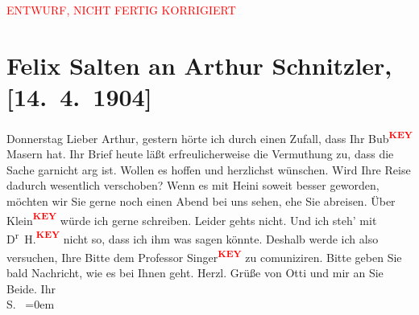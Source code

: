 
\begin{center}
            \textcolor{red}{ENTWURF, NICHT FERTIG KORRIGIERT}
                      \end{center}
            
         
         \renewcommand{\erwaehntePersonen}{Personen: Ottilie Salten, Heinrich Schnitzler, Olga Schnitzler}
         \renewcommand{\erwaehnteOrte}{Orte: Wien}
         \renewcommand{\erwaehnteWerke}{}
               \section[Felix Salten an Arthur Schnitzler, {[}14. 4. 1904{]}]{ Felix Salten an Arthur Schnitzler, {[}14. 4. 1904{]}}\nopagebreak{}\rehead{ }\begin{ledgroupsized}[t]{13cm}\normalsize\beginnumbering \toendnotes[C]{\smallbreak\pagebreak[2]} 
\toendnotes[C]{\smallbreak}\pstart
           \raggedleft{}{\pb}Donnerstag\pend
           \pstart
           Lieber Arthur, gestern hörte ich durch einen Zufall, dass Ihr Bub\textcolor{red}{\textsuperscript{\textbf{KEY}}} Masern hat. Ihr Brief heute läßt
               erfreulicherweise die Vermuthung zu, dass die Sache garnicht arg ist. Wollen es
               hoffen und herzlichst wünschen. Wird Ihre Reise dadurch wesentlich verschoben? Wenn
               es mit Heini soweit besser geworden, möchten wir Sie
               gerne noch einen Abend bei uns sehen, ehe Sie abreisen. \pend
           \pstart
           Über Klein\textcolor{red}{\textsuperscript{\textbf{KEY}}} würde ich gerne schreiben. Leider gehts
               nicht. Und ich steh’ mit D\textsuperscript{r} H.\textcolor{red}{\textsuperscript{\textbf{KEY}}} nicht so, dass ich ihm was sagen könnte. Deshalb werde ich also
               versuchen, Ihre Bitte dem Professor Singer\textcolor{red}{\textsuperscript{\textbf{KEY}}} zu
               comuniziren. \pend
           \pstart
           Bitte geben Sie bald Nachricht, {\pb}wie es bei Ihnen geht. \pend
           \pstart
           Herzl. Grüße von Otti und mir an Sie Beide.\pend
           \pstart
           Ihr {\\[\baselineskip]}\spacefill\mbox{S. }\pend
           \leftskip=0em{}
         

\end{ledgroupsized}

